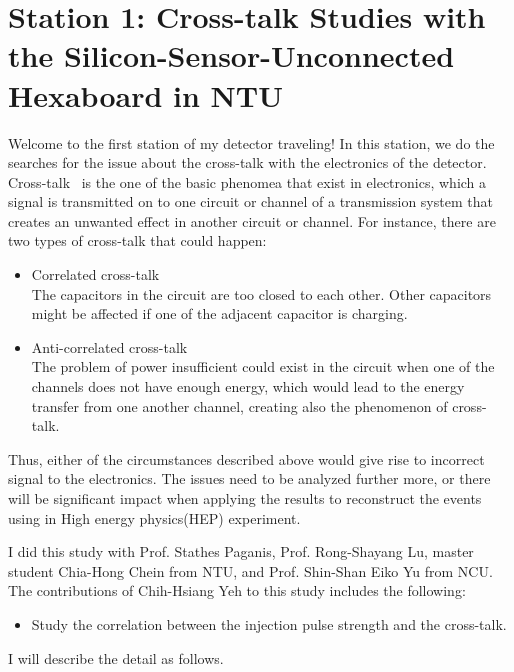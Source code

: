 \documentclass[12pt,twoside,a4paper,an,final]{cms-tdr}
\begin{document}
\section{Station 1: Cross-talk Studies with the Silicon-Sensor-Unconnected Hexaboard in NTU \label{sec:cross-talk}}
Welcome to the first station of my detector traveling! In this station, we do the searches for the issue about the cross-talk with the electronics of the detector.\\ 

Cross-talk~\cite{1177507} is the one of the basic phenomea that exist in electronics, which a signal is transmitted on to one circuit or channel of a transmission system that creates an unwanted effect in another circuit or channel. For instance, there are two types of cross-talk that could happen:
\begin{itemize}
\item Correlated cross-talk\\
The capacitors in the circuit are too closed to each other. Other capacitors might be affected if one of the adjacent capacitor is charging. 
\item Anti-correlated cross-talk\\
The problem of power insufficient could exist in the circuit when one of the channels does not have enough energy, which would lead to the energy transfer from one another channel, creating also the phenomenon of cross-talk.  
\end{itemize}


Thus, either of the circumstances described above would give rise to incorrect signal to the electronics. The issues need to be analyzed further more, or there will be significant impact when applying the results to reconstruct the events using in High energy physics(HEP) experiment.

I did this study with Prof. Stathes Paganis, Prof. Rong-Shayang Lu, master student Chia-Hong Chein from NTU, and Prof. Shin-Shan Eiko Yu from NCU.  The contributions of Chih-Hsiang Yeh to this study includes the following:
\begin{itemize}
\item Study the correlation between the injection pulse strength and the cross-talk.
\end{itemize}
I will describe the detail as follows.
\end{document}
